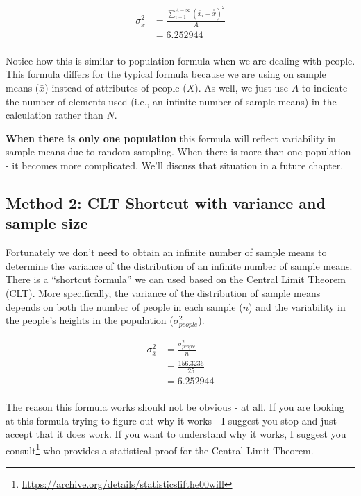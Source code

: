 \documentclass[
]{krantz}
\renewcommand{\href}[2]{#2\footnote{\url{#1}}}
\begin{document}
\[
\begin{aligned} 
\sigma_{\bar{x}}^2 &= \frac{\sum_{i=1}^{A=\infty}{(\bar{x}_i - \bar{\bar{x}})^2}}{A}\\
&= 6.252944\\
\end{aligned} 
\]

Notice how this is similar to population formula when we are dealing with people. This formula differs for the typical formula because we are using on sample means (\(\bar{x}\)) instead of attributes of people (\(X\)). As well, we just use \(A\) to indicate the number of elements used (i.e., an infinite number of sample means) in the calculation rather than \(N\).

\textbf{When there is only one population} this formula will reflect variability in sample means due to random sampling. When there is more than one population - it becomes more complicated. We'll discuss that situation in a future chapter.

\hypertarget{method-2-clt-shortcut-with-variance-and-sample-size}{%
\subsection{Method 2: CLT Shortcut with variance and sample size}\label{method-2-clt-shortcut-with-variance-and-sample-size}}

Fortunately we don't need to obtain an infinite number of sample means to determine the variance of the distribution of an infinite number of sample means. There is a ``shortcut formula'' we can used based on the Central Limit Theorem (CLT). More specifically, the variance of the distribution of sample means depends on both the number of people in each sample (\(n\)) and the variability in the people's heights in the population (\(\sigma_{people}^2\)).

\[
\begin{aligned} 
\sigma_{\bar{x}}^2 &= \frac{\sigma_{people}^2}{n}\\
&= \frac{156.3236}{25}\\
&= 6.252944\\
\end{aligned} 
\]

The reason this formula works should not be obvious - at all. If you are looking at this formula trying to figure out why it works - I suggest you stop and just accept that it does work. If you want to understand why it works, I suggest you \href{https://archive.org/details/statisticsfifthe00will}{consult} \citep{hays1994statistics} who provides a statistical proof for the Central Limit Theorem.
\end{document}
